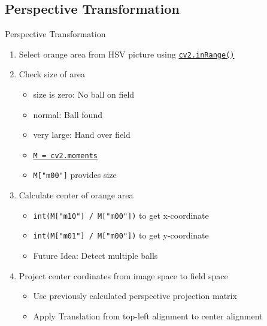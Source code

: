 \subsection{Perspective Transformation}\label{subsection:program_perspctiveTransformation}
\begin{frame}{Perspective Transformation}
    \begin{enumerate}
        \item Select orange area from HSV picture using \texttt{\href{https://docs.opencv.org/3.4.20/d2/de8/group__core__array.html\#ga48af0ab51e36436c5d04340e036ce981}{cv2.inRange()}}
        \item Check size of area
        \begin{itemize}
            \item size is zero: No ball on field
            \item normal: Ball found
            \item very large: Hand over field
            \item \texttt{\href{https://docs.opencv.org/3.4.20/d3/dc0/group__imgproc__shape.html\#ga556a180f43cab22649c23ada36a8a139}{M = cv2.moments}}
            \item \texttt{M["m00"]} provides size
        \end{itemize}
        \item Calculate center of orange area
        \begin{itemize}
            \item \texttt{int(M["m10"] / M["m00"])} to get x-coordinate
            \item \texttt{int(M["m01"] / M["m00"])} to get y-coordinate
            \item Future Idea: Detect multiple balls
        \end{itemize}
        \item Project center cordinates from image space to field space
        \begin{itemize}
            \item Use previously calculated perspective projection matrix
            \item Apply Translation from top-left alignment to center alignment
        \end{itemize}
    \end{enumerate}
\end{frame}